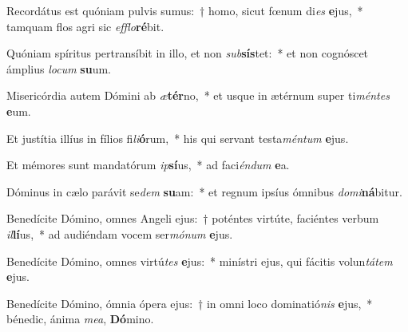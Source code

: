 \item Recordátus est quóniam pulvis sumus:~† homo, sicut fœnum di\textit{es} \textbf{e}jus,~* tamquam flos agri sic \textit{ef}\textit{flo}\textbf{ré}bit.
\item Quóniam spíritus pertransíbit in illo, et non \textit{sub}\textbf{sís}tet:~* et non cognóscet ámplius \textit{lo}\textit{cum} \textbf{su}um.
\item Misericórdia autem Dómini ab \textit{æ}\textbf{tér}no,~* et usque in ætérnum super ti\textit{mén}\textit{tes} \textbf{e}um.
\item Et justítia illíus in fílios fi\textit{li}\textbf{ó}rum,~* his qui servant testa\textit{mén}\textit{tum} \textbf{e}jus.
\item Et mémores sunt mandatórum \textit{ip}\textbf{sí}us,~* ad faci\textit{én}\textit{dum} \textbf{e}a.
\item Dóminus in cælo parávit se\textit{dem} \textbf{su}am:~* et regnum ipsíus ómnibus \textit{do}\textit{mi}\textbf{ná}bitur.
\item Benedícite Dómino, omnes Angeli ejus:~† poténtes virtúte, faciéntes verbum \textit{il}\textbf{lí}us,~* ad audiéndam vocem ser\textit{mó}\textit{num} \textbf{e}jus.
\item Benedícite Dómino, omnes virtú\textit{tes} \textbf{e}jus:~* minístri ejus, qui fácitis volun\textit{tá}\textit{tem} \textbf{e}jus.
\item Benedícite Dómino, ómnia ópera ejus:~† in omni loco dominatió\textit{nis} \textbf{e}jus,~* bénedic, ánima \textit{me}\textit{a}, \textbf{Dó}mino.
